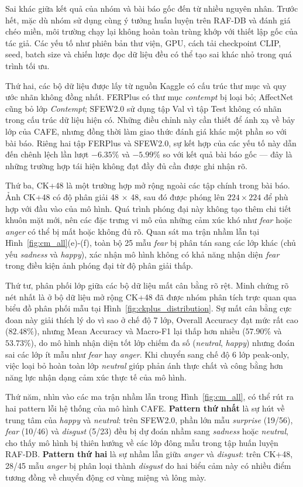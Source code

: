 Sai khác giữa kết quả của nhóm và bài báo gốc đến từ nhiều nguyên nhân. Trước hết, mặc dù nhóm sử dụng cùng ý tưởng huấn luyện trên RAF-DB và đánh giá chéo miền, môi trường chạy lại không hoàn toàn trùng khớp với thiết lập gốc của tác giả. Các yếu tố như phiên bản thư viện, GPU, cách tải checkpoint CLIP, seed, batch size và chiến lược đọc dữ liệu đều có thể tạo sai khác nhỏ trong quá trình tối ưu.

Thứ hai, các bộ dữ liệu được lấy từ nguồn Kaggle có cấu trúc thư mục và quy ước nhãn không đồng nhất. FERPlus có thư mục \textit{contempt} bị loại bỏ; AffectNet cũng bỏ lớp \textit{Contempt}; SFEW2.0 sử dụng tập Val vì tập Test không có nhãn trong cấu trúc dữ liệu hiện có. Những điều chỉnh này cần thiết để ánh xạ về bảy lớp của CAFE, nhưng đồng thời làm giao thức đánh giá khác một phần so với bài báo. Riêng hai tập FERPlus và SFEW2.0, sự kết hợp của các yếu tố này dẫn đến chênh lệch lần lượt $-6.35\%$ và $-5.99\%$ so với kết quả bài báo gốc --- đây là những trường hợp tái hiện không đạt đầy đủ cần được ghi nhận rõ.

Thứ ba, CK+48 là một trường hợp mở rộng ngoài các tập chính trong bài báo. Ảnh CK+48 có độ phân giải 48 $\times$ 48, sau đó được phóng lên $224 \times 224$ để phù hợp với đầu vào của mô hình. Quá trình phóng đại này không tạo thêm chi tiết khuôn mặt mới, nên các đặc trưng vi mô của những cảm xúc khó như \textit{fear} hoặc \textit{anger} có thể bị mất hoặc không đủ rõ. Quan sát ma trận nhầm lẫn tại Hình~\ref{fig:cm_all}(e)-(f), toàn bộ 25 mẫu \textit{fear} bị phân tán sang các lớp khác (chủ yếu \textit{sadness} và \textit{happy}), xác nhận mô hình không có khả năng nhận diện \textit{fear} trong điều kiện ảnh phóng đại từ độ phân giải thấp.

Thứ tư, phân phối lớp giữa các bộ dữ liệu mất cân bằng rõ rệt. Minh chứng rõ nét nhất là ở bộ dữ liệu mở rộng CK+48 đã được nhóm phân tích trực quan qua biểu đồ phân phối mẫu tại Hình~\ref{fig:ckplus_distribution}. Sự mất cân bằng cực đoan này giải thích lý do vì sao ở chế độ 7 lớp, Overall Accuracy đạt mức rất cao ($82.48\%$), nhưng Mean Accuracy và Macro-F1 lại thấp hơn nhiều ($57.90\%$ và $53.73\%$), do mô hình nhận diện tốt lớp chiếm đa số (\textit{neutral}, \textit{happy}) nhưng đoán sai các lớp ít mẫu như \textit{fear} hay \textit{anger}. Khi chuyển sang chế độ 6 lớp peak-only, việc loại bỏ hoàn toàn lớp \textit{neutral} giúp phản ánh thực chất và công bằng hơn năng lực nhận dạng cảm xúc thực tế của mô hình.

Thứ năm, nhìn vào các ma trận nhầm lẫn trong Hình~\ref{fig:cm_all}, có thể rút ra hai pattern lỗi hệ thống của mô hình CAFE. \textbf{Pattern thứ nhất} là sự hút về trung tâm của \textit{happy} và \textit{neutral}: trên SFEW2.0, phần lớn mẫu \textit{surprise} (19/56), \textit{fear} (10/46) và \textit{disgust} (5/23) đều bị dự đoán nhầm sang \textit{sadness} hoặc \textit{neutral}, cho thấy mô hình bị thiên hướng về các lớp đông mẫu trong tập huấn luyện RAF-DB. \textbf{Pattern thứ hai} là sự nhầm lẫn giữa \textit{anger} và \textit{disgust}: trên CK+48, 28/45 mẫu \textit{anger} bị phân loại thành \textit{disgust} do hai biểu cảm này có nhiều điểm tương đồng về chuyển động cơ vùng miệng và lông mày.

